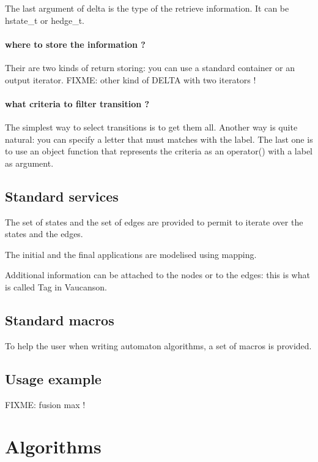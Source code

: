 \documentclass{article}
\begin{document}
\begin{code}
The last argument of delta is the type of the retrieve information. It can be hstate\_t or hedge\_t.

\paragraph{where to store the information ?}

Their are two kinds of return storing: you can use a standard container or an output iterator. FIXME: other kind of DELTA with two iterators !

\paragraph{what criteria to filter transition ?}

The simplest way to select transitions is to get them all. Another way is quite natural: you can specify a letter that must matches with the label. The last one is to use an object function that represents the criteria as an operator() with a label as argument.

\subsection{Standard services}

The set of states and the set of edges are provided to permit to iterate over the states and the edges. 

The initial and the final applications are modelised using mapping. 

Additional information can be attached to  the nodes or to the edges: this is what is called Tag in Vaucanson.

\subsection{Standard macros}

To help the user when writing automaton algorithms, a set of macros is provided.

\subsection{Usage example}

FIXME: fusion max !

\section{Algorithms}


\end{code}
\end{document}
